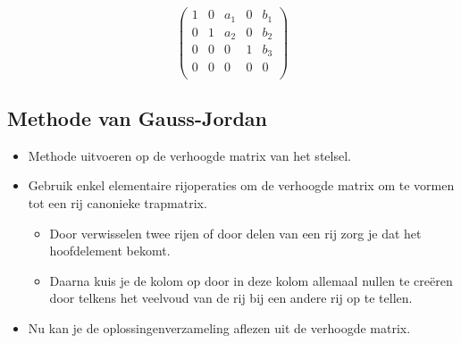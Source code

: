 \documentclass[12pt,twoside]{article}
\begin{document}
$$
\begin{pmatrix}
  1 & 0 & a_1 & 0 & b_1 \\
  0 & 1 & a_2 & 0 & b_2 \\
  0 & 0 & 0   & 1 & b_3 \\
  0 & 0 & 0   & 0 & 0   \\
\end{pmatrix}
$$


\subsection{Methode van Gauss-Jordan}

\begin{itemize}
\item Methode uitvoeren op de verhoogde matrix van het stelsel.
\item Gebruik enkel elementaire rijoperaties om de verhoogde matrix om te vormen tot een rij canonieke trapmatrix.
  \begin{itemize}
  \item Door verwisselen twee rijen of door delen van een rij zorg je dat het hoofdelement bekomt.
  \item Daarna kuis je de kolom op door in deze kolom allemaal nullen te creëren door telkens het veelvoud van de rij bij een andere rij op te tellen.
  \end{itemize}
\item Nu kan je de oplossingenverzameling aflezen uit de verhoogde matrix.
\end{itemize}
\end{document}

